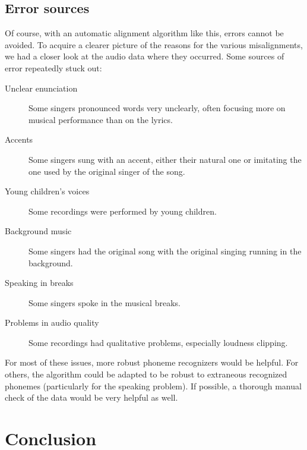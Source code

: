 \subsection{Error sources}
Of course, with an automatic alignment algorithm like this, errors cannot be avoided. To acquire a clearer picture of the reasons for the various misalignments, we had a closer look at the audio data where they occurred. Some sources of error repeatedly stuck out:
\begin{description}
 \item[Unclear enunciation]{Some singers pronounced words very unclearly, often focusing more on musical performance than on the lyrics.}
 \item[Accents]{Some singers sung with an accent, either their natural one or imitating the one used by the original singer of the song.}
 \item[Young children's voices]{Some recordings were performed by young children.}
 \item[Background music]{Some singers had the original song with the original singing running in the background.}
 \item[Speaking in breaks]{Some singers spoke in the musical breaks.}
 \item[Problems in audio quality]{Some recordings had qualitative problems, especially loudness clipping.}
\end{description}
For most of these issues, more robust phoneme recognizers would be helpful. For others, the algorithm could be adapted to be robust to extraneous recognized phonemes (particularly for the speaking problem). If possible, a thorough manual check of the data would be very helpful as well.



\section{Conclusion}
